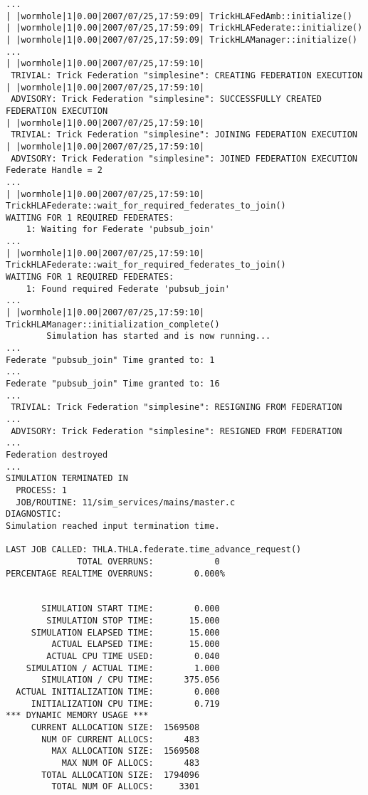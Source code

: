 \begin{lstlisting}[caption={{\tt SIM\_simplesine\_hla\_join} output},label={list:SIM-simplesine-hla-join-output}]
...
| |wormhole|1|0.00|2007/07/25,17:59:09| TrickHLAFedAmb::initialize()
| |wormhole|1|0.00|2007/07/25,17:59:09| TrickHLAFederate::initialize()
| |wormhole|1|0.00|2007/07/25,17:59:09| TrickHLAManager::initialize()
...
| |wormhole|1|0.00|2007/07/25,17:59:10|
 TRIVIAL: Trick Federation "simplesine": CREATING FEDERATION EXECUTION
| |wormhole|1|0.00|2007/07/25,17:59:10|
 ADVISORY: Trick Federation "simplesine": SUCCESSFULLY CREATED FEDERATION EXECUTION
| |wormhole|1|0.00|2007/07/25,17:59:10|
 TRIVIAL: Trick Federation "simplesine": JOINING FEDERATION EXECUTION
| |wormhole|1|0.00|2007/07/25,17:59:10|
 ADVISORY: Trick Federation "simplesine": JOINED FEDERATION EXECUTION
Federate Handle = 2
...
| |wormhole|1|0.00|2007/07/25,17:59:10| TrickHLAFederate::wait_for_required_federates_to_join()
WAITING FOR 1 REQUIRED FEDERATES:
    1: Waiting for Federate 'pubsub_join'
...
| |wormhole|1|0.00|2007/07/25,17:59:10| TrickHLAFederate::wait_for_required_federates_to_join()
WAITING FOR 1 REQUIRED FEDERATES:
    1: Found required Federate 'pubsub_join'
...
| |wormhole|1|0.00|2007/07/25,17:59:10| TrickHLAManager::initialization_complete()
        Simulation has started and is now running...
...
Federate "pubsub_join" Time granted to: 1
...
Federate "pubsub_join" Time granted to: 16
...
 TRIVIAL: Trick Federation "simplesine": RESIGNING FROM FEDERATION
...
 ADVISORY: Trick Federation "simplesine": RESIGNED FROM FEDERATION
...
Federation destroyed
...
SIMULATION TERMINATED IN
  PROCESS: 1
  JOB/ROUTINE: 11/sim_services/mains/master.c
DIAGNOSTIC:
Simulation reached input termination time.

LAST JOB CALLED: THLA.THLA.federate.time_advance_request()
              TOTAL OVERRUNS:            0
PERCENTAGE REALTIME OVERRUNS:        0.000%


       SIMULATION START TIME:        0.000
        SIMULATION STOP TIME:       15.000
     SIMULATION ELAPSED TIME:       15.000
         ACTUAL ELAPSED TIME:       15.000
        ACTUAL CPU TIME USED:        0.040
    SIMULATION / ACTUAL TIME:        1.000
       SIMULATION / CPU TIME:      375.056
  ACTUAL INITIALIZATION TIME:        0.000
     INITIALIZATION CPU TIME:        0.719
*** DYNAMIC MEMORY USAGE ***
     CURRENT ALLOCATION SIZE:  1569508
       NUM OF CURRENT ALLOCS:      483
         MAX ALLOCATION SIZE:  1569508
           MAX NUM OF ALLOCS:      483
       TOTAL ALLOCATION SIZE:  1794096
         TOTAL NUM OF ALLOCS:     3301
\end{lstlisting}

